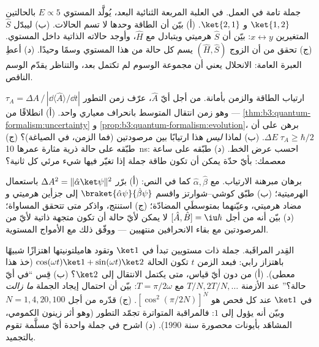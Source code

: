 \begin{exercise}[$\star\star$]\label{exo:b3:quantum-formalism:9}
جملة تامة في العمل. في العلبة المربعة الثنائية البعد، يُولَّد المستوي $E
\propto 5$ بالحالتين $\ket{1,2}$ و $\ket{2,1}$. (أ) بيّن أن
الطاقة وحدها لا تسم الحالات. (ب) ليبدّل $\hat S$ المتغيرين $x
\leftrightarrow y$: بيّن أن $\hat S$ هرميتي ويتبادل مع $\hat
H$، وأوجد حالاته الذاتية داخل المستوي. (ج) تحقق من أن الزوج $(\hat H, \hat S)$ يسم
كل حالة من هذا المستوي وسمًا وحيدًا. (د) أعطِ العبرة العامة:
الانحلال يعني أن مجموعة الوسوم لم تكتمل بعد،
والتناظر يقدّم الوسم الناقص.
\end{exercise}

\begin{exercise}[$\star\star\star$]\label{exo:b3:quantum-formalism:10}
ارتياب الطاقة والزمن بأمانة. من أجل أيّ  $\hat A$،
عرّف زمن التطور $\tau_A = \Delta A\,/\,|\dd\langle\hat
A\rangle/\dd t|$ --- وهو زمن انتقال المتوسط بانحراف معياري
واحد. (أ) انطلاقًا من \cref{thm:b3:quantum-formalism:uncertainty} و
\cref{prop:b3:quantum-formalism:evolution}، برهن على أن $\Delta
E\;\tau_A \ge \hbar/2$. (ب) لماذا \emph{ليس} هذا ارتيابًا
بين مرصودتين (فما الزمن، في الصياغة)؟ (ج) طبّقه
على حالة ذرية مثارة عمرها \qty{10}{ns}: احسب عرض الخط. (د)
طبّقه على ساعة معصمك: بأيّ حدّة يمكن أن تكون طاقة جملة إذا
تغيّر فيها شيء مرئي كل ثانية؟
\end{exercise}

\begin{exercise}[$\star\star\star$]\label{exo:b3:quantum-formalism:11}
برهان مبرهنة الارتياب. مع $\hat\alpha, \hat\beta$ كما في
النص: (أ) برّر $\Delta A^2 = \|\hat\alpha\ket\psi\|^2$ باستعمال
الهرميتية؛ (ب) طبّق كوشي--شوارتز واقسم
$\braket{\hat\alpha\psi}{\hat\beta\psi}$ إلى جزأين هرميتي و
مضاد هرميتي، وعيّنهما بمتوسطَي  
المضادّة؛ (ج) استنتج، واذكر متى تتحقق المساواة؛
(د) بيّن أنه من أجل $[\hat A, \hat B] = \iu\hbar$ لا يمكن لأيّ حالة أن تكون
متجهة ذاتية لأيّ من المرصودتين مع بقاء الانحرافين
منتهيين --- ووفّق ذلك مع الأمواج المستوية.
\end{exercise}

\begin{exercise}[$\star\star\star$]\label{exo:b3:quantum-formalism:12}
القِدر المراقَبة. جملة ذات مستويين تبدأ في $\ket1$ وتقود
هاميلتونيتها اهتزازًا شبيهًا باهتزاز رابي: فبعد الزمن $t$ تكون الحالة
$\cos(\omega t)\ket1 + \sin(\omega t)\ket2$ (خذ هذا معطى).
(أ) من دون أيّ قياس، متى يكتمل الانتقال إلى $\ket2$؟
(ب) قِس ``في أيّ حالة؟'' عند الأزمنة $T/N, 2T/N, \dots$ مع $T =
\pi/2\omega$: بيّن أن احتمال إيجاد الجملة
\emph{ما زالت} في $\ket1$ عند كل فحص هو $[\cos^2(\pi/2N)]^N$. (ج)
قدّره من أجل $N = 1, 4, 20, 100$ وبيّن أنه يؤول إلى $1$: فالمراقبة
المتواترة تجمّد التطور (وهو أثر زينون الكمومي،
المشاهَد بأيونات محصورة سنة 1990). (د) اشرح في جملة واحدة
أيّ مسلَّمة تقوم بالتجميد.
\end{exercise}

